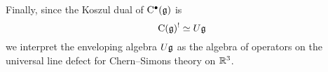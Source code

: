 \documentclass[11pt]{amsart}
\def\natalie#1{{\textcolor{green!65!black}{NMP: {#1}}}}
\begin{document}
%
%
%
%
Finally, since the Koszul dual of ${\rm C}^\bullet(\mathfrak g)$ is 
\[
{\rm C}(\mathfrak g)^! \simeq U \mathfrak g 
\]
we interpret the enveloping algebra $U \mathfrak g$ as the algebra of operators on the universal line defect for Chern--Simons theory on $\mathbb R^3$. 
\end{document}
